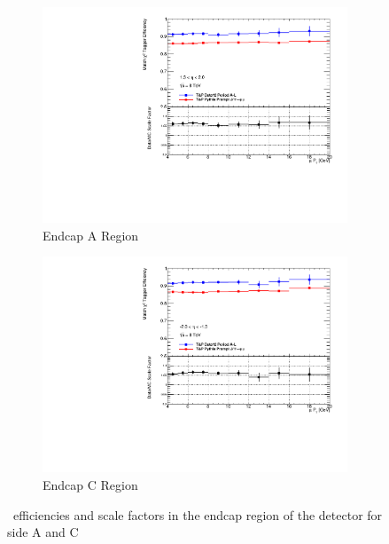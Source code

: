 \begin{figure}[tbhp]
  \centering
  \begin{subfigure}[b]{0.85\textwidth}
    \includegraphics[width=\textwidth]{PartCalibration2012/Plots/SFPlots/Endcap_A_smt.pdf}
    \caption{Endcap A Region} \label{fig:CalibrationScaleFactorEndcapA}
  \end{subfigure}
  
  \begin{subfigure}[b]{0.85\textwidth}
    \includegraphics[width=\textwidth]{PartCalibration2012/Plots/SFPlots/Endcap_C_smt.pdf}
    \caption{Endcap C Region} \label{fig:CalibrationScaleFactorEndcapC}
  \end{subfigure}
  \caption{\xsm\ efficiencies and scale factors in the endcap region of the detector for side  A and  C} \label{fig:CalibrationScaleFactorEndcap}
\end{figure}

